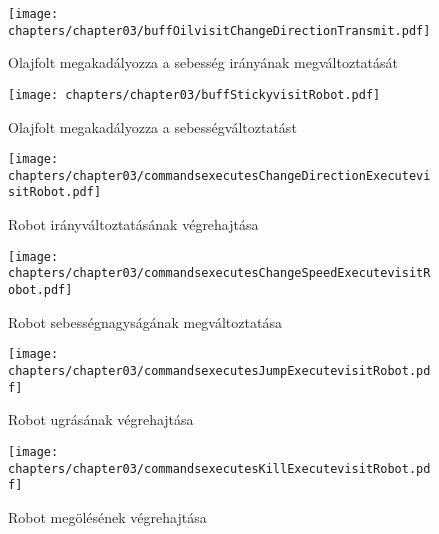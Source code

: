 \begin{figure}[h]
	\begin{center}
		\texttt{[image: chapters/chapter03/buffOilvisitChangeDirectionTransmit.pdf]}
		\caption{Olajfolt megakadályozza a sebesség irányának megváltoztatását}
		\label{fig:buff.Oil.visit2}
	\end{center}
\end{figure}

\begin{figure}[h]
	\begin{center}
		\texttt{[image: chapters/chapter03/buffStickyvisitRobot.pdf]}
		\caption{Olajfolt megakadályozza a sebességváltoztatást}
		\label{fig:buff.Sticky.visit}
	\end{center}
\end{figure}

\begin{figure}[h]
	\begin{center}
		\texttt{[image: chapters/chapter03/commandsexecutesChangeDirectionExecutevisitRobot.pdf]}
		\caption{Robot irányváltoztatásának végrehajtása}
		\label{fig:command.executes.ChangeDirectionExecute.visit}
	\end{center}
\end{figure}

\begin{figure}[h]
	\begin{center}
		\texttt{[image: chapters/chapter03/commandsexecutesChangeSpeedExecutevisitRobot.pdf]}
		\caption{Robot sebességnagyságának megváltoztatása}
		\label{fig:command.executes.ChangeSpeedExecute.visit}
	\end{center}
\end{figure}

\begin{figure}[h]
	\begin{center}
		\texttt{[image: chapters/chapter03/commandsexecutesJumpExecutevisitRobot.pdf]}
		\caption{Robot ugrásának végrehajtása}
		\label{fig:command.executes.JumpExecute.visit}
	\end{center}
\end{figure}

\begin{figure}[h]
	\begin{center}
		\texttt{[image: chapters/chapter03/commandsexecutesKillExecutevisitRobot.pdf]}
		\caption{Robot megölésének végrehajtása}
		\label{fig:command.executes.KillExecute.visit}
	\end{center}
\end{figure}

